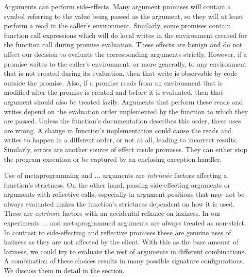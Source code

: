 \documentclass[screen,acmsmall]{acmart}
\begin{document}
Arguments can perform side-effects. Many argument promises will contain a symbol
referring to the value being passed as the argument, so they will at least
perform a read in the caller's environment. Similarly, some promises contain
function call expressions which will do local writes in the environment created
for the function call during promise evaluation. These effects are benign and do
not affect our decision to evaluate the corresponding arguments strictly.
However, if a promise writes to the caller's environment, or more generally, to
any environment that is not created during its evaluation, then that write is
observable by code outside the promise. Also, if a promise reads from an
environment that is modified after the promise is created and before it is
evaluated, then that argument should also be treated lazily. Arguments that
perform these reads and writes depend on the evaluation order implemented by the
function to which they are passed. Unless the function's documentation describes
this order, these uses are wrong. A change in function's implementation could
cause the reads and writes to happen in a different order, or not at all,
leading to incorrect results. Similarly, errors are another source of effect
inside promises. They can either stop the program execution or be captured by an
enclosing exception handler.

Use of metaprogramming and $...$ arguments are \emph{intrinsic} factors
affecting a function's strictness. On the other hand, passing side-effecting
arguments or arguments with reflective calls, especially in argument positions
that may not be always evaluated makes the function's strictness dependent on
how it is used. These are \emph{extrinsic} factors with an accidental reliance
on laziness. In our experiments $...$ and metaprogrammed arguments are always
treated as non-strict. In contrast to side-effecting and reflective promises
these are genuine uses of laziness as they are not affected by the client. With
this as the base amount of laziness, we could try to evaluate the rest of
arguments in different combinations. A combination of these choices results in
many possible signature configurations. We discuss them in detail in the
 section.
\end{document}

